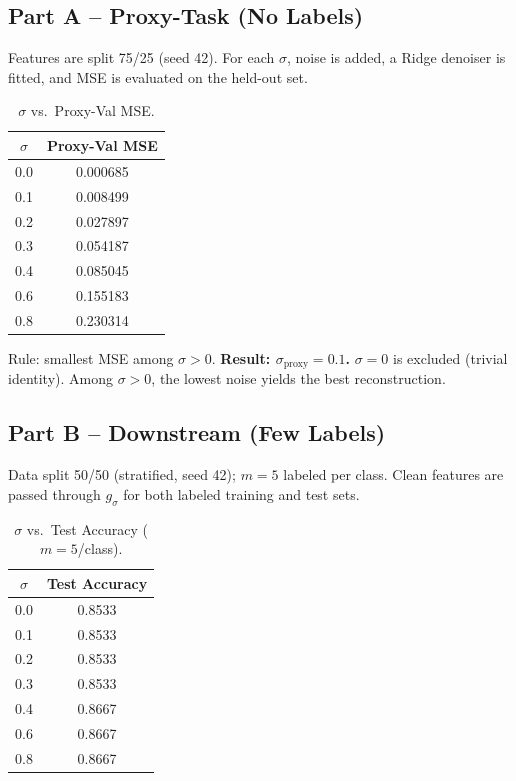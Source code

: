 \documentclass[11pt]{article}
\begin{document}
\subsection{Part A -- Proxy-Task (No Labels)}
Features are split 75/25 (seed 42). For each $\sigma$, noise is added, a Ridge
denoiser is fitted, and MSE is evaluated on the held-out set.

\begin{table}[h]
\centering
\begin{tabular}{cc}
\toprule
$\sigma$ & Proxy-Val MSE \\
\midrule
0.0 & 0.000685 \\
0.1 & 0.008499 \\
0.2 & 0.027897 \\
0.3 & 0.054187 \\
0.4 & 0.085045 \\
0.6 & 0.155183 \\
0.8 & 0.230314 \\
\bottomrule
\end{tabular}
\caption{$\sigma$ vs.\ Proxy-Val MSE.}
\end{table}

Rule: smallest MSE among $\sigma > 0$. \quad
\textbf{Result: $\sigma_{\text{proxy}} = 0.1$.}
$\sigma{=}0$ is excluded (trivial identity). Among $\sigma > 0$, the lowest
noise yields the best reconstruction.

\subsection{Part B -- Downstream (Few Labels)}
Data split 50/50 (stratified, seed 42); $m{=}5$ labeled per class. Clean
features are passed through $g_\sigma$ for both labeled training and test sets.

\begin{table}[h]
\centering
\begin{tabular}{cc}
\toprule
$\sigma$ & Test Accuracy \\
\midrule
0.0 & 0.8533 \\
0.1 & 0.8533 \\
0.2 & 0.8533 \\
0.3 & 0.8533 \\
0.4 & 0.8667 \\
0.6 & 0.8667 \\
0.8 & 0.8667 \\
\bottomrule
\end{tabular}
\caption{$\sigma$ vs.\ Test Accuracy ($m{=}5$/class).}
\end{table}
\end{document}
